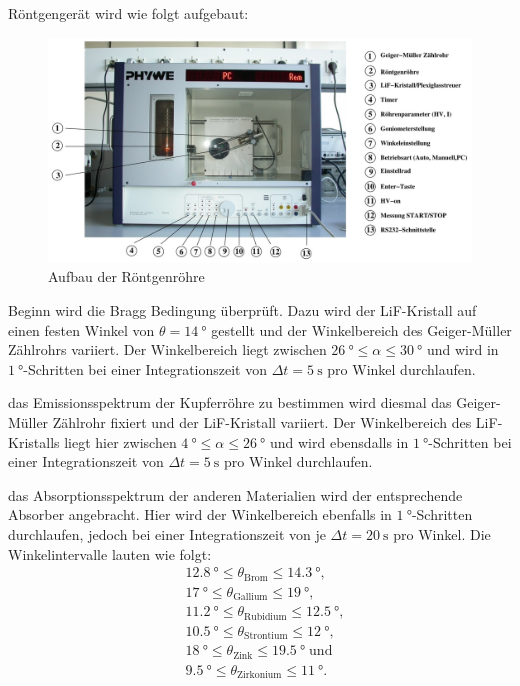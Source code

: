 \justifying Röntgengerät wird wie folgt aufgebaut:
\begin{figure}[H]
    \centering
    \includegraphics[width=\textwidth]{./images/Röntgenröhre.jpg}
    \caption{Aufbau der Röntgenröhre \cite{V602}}
    \label{fig:1}
\end{figure}
\justifying Beginn wird die Bragg Bedingung überprüft. Dazu wird der LiF-Kristall auf einen festen Winkel von $\theta=\SI{14}{\degree}$ gestellt und der
Winkelbereich des Geiger-Müller Zählrohrs variiert. Der Winkelbereich liegt zwischen $\SI{26}{\degree}\leq\alpha\leq\SI{30}{\degree}$ und wird in
$\SI{1}{\degree}$-Schritten bei einer Integrationszeit von $\Delta t=\SI{5}{\second}$ pro Winkel durchlaufen. 

\justifying das Emissionsspektrum der Kupferröhre zu bestimmen wird diesmal das Geiger-Müller Zählrohr fixiert und der LiF-Kristall
variiert. Der Winkelbereich des LiF-Kristalls liegt hier zwischen $\SI{4}{\degree}\leq\alpha\leq\SI{26}{\degree}$ und wird ebensdalls in 
$\SI{1}{\degree}$-Schritten bei einer Integrationszeit von $\Delta t=\SI{5}{\second}$ pro Winkel durchlaufen.

\justifying das Absorptionsspektrum der anderen Materialien wird der entsprechende Absorber angebracht. Hier wird der Winkelbereich
ebenfalls in $\SI{1}{\degree}$-Schritten durchlaufen, jedoch bei einer Integrationszeit von je $\Delta t=\SI{20}{\second}$ pro Winkel.
Die Winkelintervalle lauten wie folgt:\\
\begin{align*}
    &\SI{12.8}{\degree}\leq\theta_{\text{Brom}}\leq\SI{14.3}{\degree},\\ 
    &\SI{17}{\degree}\leq\theta_{\text{Gallium}}\leq\SI{19}{\degree},\\
    &\SI{11.2}{\degree}\leq\theta_{\text{Rubidium}}\leq\SI{12.5}{\degree},\\
    &\SI{10.5}{\degree}\leq\theta_{\text{Strontium}}\leq\SI{12}{\degree},\\
    &\SI{18}{\degree}\leq\theta_{\text{Zink}}\leq\SI{19.5}{\degree}\;\text{und}\\
    &\SI{9.5}{\degree}\leq\theta_{\text{Zirkonium}}\leq\SI{11}{\degree}.
\end{align*}


